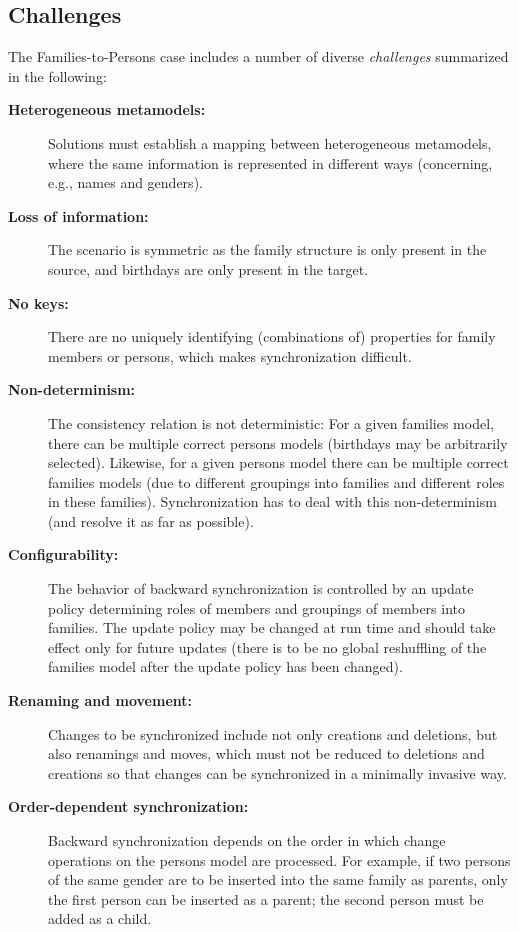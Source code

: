 \subsection{Challenges}
\label{sec:Challenges}

The Families-to-Persons case includes a number of diverse \emph{challenges} summarized in the following:

\begin{description}
	\item[\textbf{Heterogeneous metamodels:}] 
	Solutions must establish a mapping between heterogeneous metamodels, where the same information is represented in different ways (concerning, e.g., names and genders).
	
	\item[\textbf{Loss of information:}] 
	The scenario is symmetric as the family structure is only present in the source, and birthdays are only present in the target.
	
	\item[\textbf{No keys:}] 
	There are no uniquely identifying (combinations of) properties for family members or persons, which makes synchronization difficult.
	
	\item[\textbf{Non-determinism:}] 
	The consistency relation is not de\-ter\-mi\-ni\-stic: For a given families model, there can be multiple correct persons models (birthdays may be arbitrarily selected). 
	Likewise, for a given persons model there can be multiple correct families models (due to different groupings into families and different roles in these families). Synchronization has to deal with this non-determinism (and resolve it as far as possible).
	
	\item[\textbf{Configurability:}] 
	The behavior of backward synchronization is controlled by an update policy determining roles of members and groupings of members into families. 
	The update policy may be changed at run time and should take effect only for future updates (there is to be no global reshuffling of the families model after the update policy has been changed).
	
	\item[\textbf{Renaming and movement:}] 
	Changes to be synchronized include not only creations and deletions, but also renamings and moves, which must not be reduced to deletions and creations so that changes can be synchronized in a minimally invasive way. 
	
	\item[\textbf{Order-dependent synchronization:}] 
	Backward synchronization depends on the order in which change operations on the persons model are processed. 
	For example, if two persons of the same gender are to be inserted into the same family as parents, only the first person can be inserted as a parent; the second person must be added as a child.
	

\end{description}
